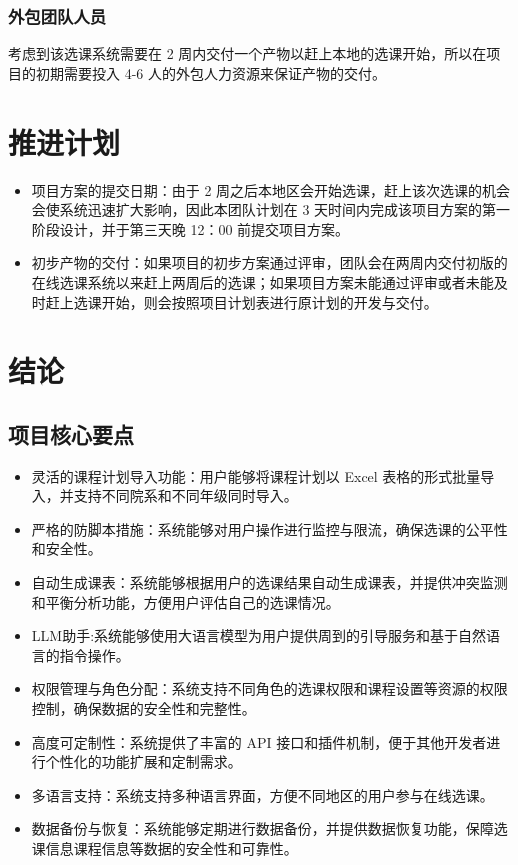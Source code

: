 \documentclass{article}
\begin{document}
\subsubsection{外包团队人员}
考虑到该选课系统需要在 2 周内交付一个产物以赶上本地的选课开始，所以在项目的初期需要投入 4-6 人的外包人力资源来保证产物的交付。

\section{推进计划}
\begin{itemize}
	\item 项目方案的提交日期：由于 2 周之后本地区会开始选课，赶上该次选课的机会会使系统迅速扩大影响，因此本团队计划在 3 天时间内完成该项目方案的第一阶段设计，并于第三天晚 12：00 前提交项目方案。
	\item 初步产物的交付：如果项目的初步方案通过评审，团队会在两周内交付初版的在线选课系统以来赶上两周后的选课；如果项目方案未能通过评审或者未能及时赶上选课开始，则会按照项目计划表进行原计划的开发与交付。
\end{itemize}

\section{结论}
\subsection{项目核心要点}
\begin{itemize}
	\item 灵活的课程计划导入功能：用户能够将课程计划以 Excel 表格的形式批量导入，并支持不同院系和不同年级同时导入。
	\item 严格的防脚本措施：系统能够对用户操作进行监控与限流，确保选课的公平性和安全性。
	\item 自动生成课表：系统能够根据用户的选课结果自动生成课表，并提供冲突监测和平衡分析功能，方便用户评估自己的选课情况。
	\item LLM助手:系统能够使用大语言模型为用户提供周到的引导服务和基于自然语言的指令操作。
	\item 权限管理与角色分配：系统支持不同角色的选课权限和课程设置等资源的权限控制，确保数据的安全性和完整性。
	\item 高度可定制性：系统提供了丰富的 API 接口和插件机制，便于其他开发者进行个性化的功能扩展和定制需求。
	\item 多语言支持：系统支持多种语言界面，方便不同地区的用户参与在线选课。
	\item 数据备份与恢复：系统能够定期进行数据备份，并提供数据恢复功能，保障选课信息课程信息等数据的安全性和可靠性。
\end{itemize}
\end{document}
